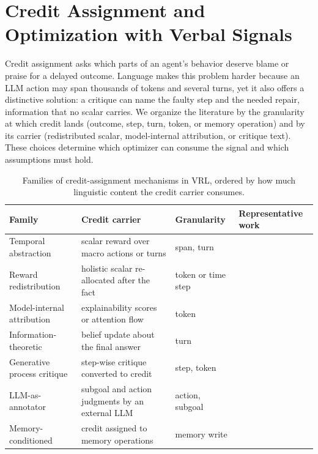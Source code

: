 \section{Credit Assignment and Optimization with Verbal Signals}
\label{sec:credit}

Credit assignment asks which parts of an agent's behavior deserve blame or praise for a delayed outcome. Language makes this problem harder because an LLM action may span thousands of tokens and several turns, yet it also offers a distinctive solution: a critique can name the faulty step and the needed repair, information that no scalar carries. We organize the literature by the granularity at which credit lands (outcome, step, turn, token, or memory operation) and by its carrier (redistributed scalar, model-internal attribution, or critique text). These choices determine which optimizer can consume the signal and which assumptions must hold.

\begin{table}[t]
\centering
\caption{Families of credit-assignment mechanisms in VRL, ordered by how much linguistic content the credit carrier consumes.}
\label{tab:credit-families}
\small
\begin{tabular}{@{}p{}p{}p{}p{}@{}}
\toprule
Family & Credit carrier & Granularity & Representative work \\
\midrule
Temporal abstraction & scalar reward over macro actions or turns & span, turn & \citep{chai2024marlhf,zhou2024archer,wei2025reinforcing} \\
Reward redistribution & holistic scalar re-allocated after the fact & token or time step & \citep{li2024red,qu2024latent} \\
Model-internal attribution & explainability scores or attention flow & token & \citep{koo2025learning,dong2026how} \\
Information-theoretic & belief update about the final answer & turn & \citep{wang2025information} \\
Generative process critique & step-wise critique converted to credit & step, token & \citep{xie2025capo,zhou2024treg,wang2026text2gradreinforcementlearningnatural,liu2025agenticreinforcementlearningimplicit} \\
LLM-as-annotator & subgoal and action judgments by an external LLM & action, subgoal & \citep{pignatelli2024assessing,zhong2024policy,lin2025speaking} \\
Memory-conditioned & credit assigned to memory operations & memory write & \citep{zhou2025memento,yan2026memoryr2} \\
\bottomrule
\end{tabular}
\end{table}

